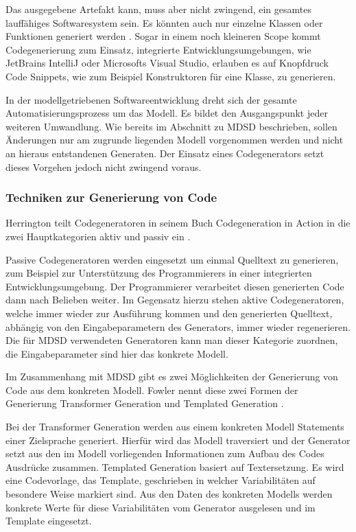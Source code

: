\documentclass[12pt,oneside,a4paper,parskip]{scrbook}
\begin{document}
Das ausgegebene Artefakt kann, muss aber nicht zwingend, ein gesamtes lauffähiges Softwaresystem sein. Es könnten auch nur einzelne Klassen oder Funktionen generiert werden \cite[S. 333]{czaeis2000}. Sogar in einem noch kleineren Scope kommt Codegenerierung zum Einsatz, integrierte Entwicklungsumgebungen, wie JetBrains IntelliJ oder Microsofts Visual Studio, erlauben es auf Knopfdruck Code Snippets, wie zum Beispiel Konstruktoren für eine Klasse, zu generieren.

In der modellgetriebenen Softwareentwicklung dreht sich der gesamte Automatisierungsprozess um das Modell. Es bildet den Ausgangspunkt jeder weiteren Umwandlung. Wie bereits im Abschnitt zu MDSD beschrieben, sollen Änderungen nur am zugrunde liegenden Modell vorgenommen werden und nicht an hieraus entstandenen Generaten. Der Einsatz eines Codegenerators setzt dieses Vorgehen jedoch nicht zwingend voraus.

\subsubsection{Techniken zur Generierung von Code}

Herrington teilt Codegeneratoren in seinem Buch Codegeneration in Action in die zwei Hauptkategorien aktiv und passiv ein \cite[S. 28]{herrington2003}. 

Passive Codegeneratoren werden eingesetzt um einmal Quelltext zu generieren, zum Beispiel zur Unterstützung des Programmierers in einer integrierten Entwicklungsumgebung. Der Programmierer verarbeitet diesen generierten Code dann nach Belieben weiter. Im Gegensatz hierzu stehen aktive Codegeneratoren, welche immer wieder zur Ausführung kommen und den generierten Quelltext, abhängig von den Eingabeparametern des Generators, immer wieder regenerieren. Die für MDSD verwendeten Generatoren kann man dieser Kategorie zuordnen, die Eingabeparameter sind hier das konkrete Modell. 

Im Zusammenhang mit MDSD gibt es zwei Möglichkeiten der Generierung von Code aus dem konkreten Modell. Fowler nennt diese zwei Formen der Generierung Transformer Generation und Templated Generation \cite[S. 124f.]{fowler2010}.

Bei der Transformer Generation werden aus einem konkreten Modell Statements einer Zielsprache generiert. Hierfür wird das Modell traversiert und der Generator setzt aus den im Modell vorliegenden Informationen zum Aufbau des Codes Ausdrücke zusammen. Templated Generation basiert auf Textersetzung. Es wird eine Codevorlage, das Template, geschrieben in welcher Variabilitäten auf besondere Weise markiert sind. Aus den Daten des konkreten Modells werden konkrete Werte für diese Variabilitäten vom Generator ausgelesen und im Template eingesetzt.
\end{document}
